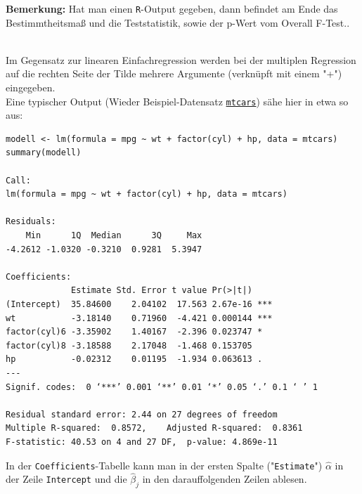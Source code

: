 \documentclass[a4paper]{article}
\newcommand\dangersign{%
 \makebox[1.8em][c]{%
 \makebox[0pt][c]{\raisebox{.15em}{\small!}}%
 \makebox[0pt][c]{\color{red}\Large$\triangle$}}}%
\begin{document}
\noindent \dangersign \textbf{Bemerkung:} Hat man einen \texttt{R}-Output gegeben, dann befindet am Ende das Bestimmtheitsmaß und die Teststatistik, sowie der p-Wert vom Overall F-Test..\\

\clearpage

\noindent {}\\

\noindent \dangersign Im Gegensatz zur linearen Einfachregression werden bei der multiplen Regression auf die rechten Seite der Tilde mehrere Argumente (verknüpft mit einem "+") eingegeben.\\

\noindent Eine typischer Output (Wieder Beispiel-Datensatz \href{https://www.rdocumentation.org/packages/datasets/versions/3.6.2/topics/mtcars}{\texttt{mtcars}}) sähe hier in etwa so aus:

\begin{small}
\begin{Verbatim}[frame=single]
modell <- lm(formula = mpg ~ wt + factor(cyl) + hp, data = mtcars)
summary(modell)

Call:
lm(formula = mpg ~ wt + factor(cyl) + hp, data = mtcars)

Residuals:
    Min      1Q  Median      3Q     Max 
-4.2612 -1.0320 -0.3210  0.9281  5.3947 

Coefficients:
             Estimate Std. Error t value Pr(>|t|)    
(Intercept)  35.84600    2.04102  17.563 2.67e-16 ***
wt           -3.18140    0.71960  -4.421 0.000144 ***
factor(cyl)6 -3.35902    1.40167  -2.396 0.023747 *  
factor(cyl)8 -3.18588    2.17048  -1.468 0.153705    
hp           -0.02312    0.01195  -1.934 0.063613 .  
---
Signif. codes:  0 ‘***’ 0.001 ‘**’ 0.01 ‘*’ 0.05 ‘.’ 0.1 ‘ ’ 1

Residual standard error: 2.44 on 27 degrees of freedom
Multiple R-squared:  0.8572,	Adjusted R-squared:  0.8361 
F-statistic: 40.53 on 4 and 27 DF,  p-value: 4.869e-11
\end{Verbatim}
\end{small}
In der \texttt{Coefficients}-Tabelle kann man in der ersten Spalte ("\texttt{Estimate}") $\hat \alpha$ in der Zeile \texttt{Intercept} und die $\hat \beta_j$ in den darauffolgenden Zeilen ablesen.\\
\end{document}

